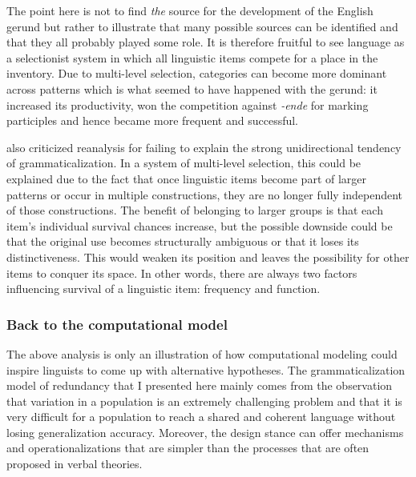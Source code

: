 The point here is not to find {\em the} source for the development of the English gerund but rather to illustrate that many possible sources can be identified and that they all probably played some role. It is therefore fruitful to see language as a selectionist system in which all linguistic items compete for a place in the inventory. Due to multi-level selection, categories can become more dominant across patterns which is what seemed to have happened with the gerund: it increased its productivity, won the competition against {\em -ende} for marking participles and hence became more frequent and successful.

\citet{haspelmath98does} also criticized reanalysis for failing to explain the strong unidirectional tendency of grammaticalization. In a system of multi-level selection, this could be explained due to the fact that once linguistic items become part of larger patterns or occur in multiple constructions, they are no longer fully independent of those constructions. The benefit of belonging to larger groups is that each item's individual survival chances increase, but the possible downside could be that the original use becomes structurally ambiguous or that it loses its distinctiveness. This would weaken its position and leaves the possibility for other items to conquer its space. In other words, there are always two factors influencing survival of a linguistic item: frequency and function.


\subsubsection{Back to the computational model}
The above analysis is only an illustration of how computational modeling could inspire linguists to come up with alternative hypotheses. The grammaticalization model of  redundancy that I presented here mainly comes from the observation that variation in a population is an extremely challenging problem and that it is very difficult for a population to reach a shared and coherent language without losing generalization accuracy. Moreover, the design stance can offer mechanisms and operationalizations that are simpler than the processes that are often proposed in verbal theories.

